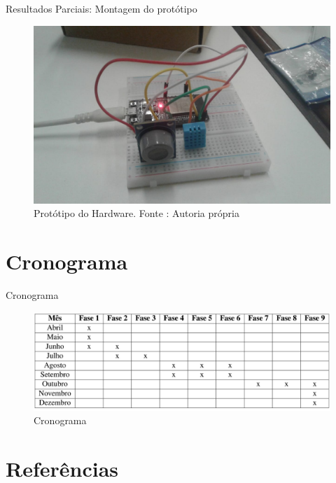 \documentclass[12pt]{beamer}
\begin{document}
    \begin{frame}{Resultados Parciais: Montagem do protótipo}
        \begin{figure}
            \centering
            \includegraphics[width=0.7\linewidth]{prototipo.jpeg}
            \caption{Protótipo do Hardware. Fonte : Autoria própria}
            \label{fig:enter-label}
        \end{figure}
    \end{frame}

    \section{Cronograma}

    \begin{frame}{Cronograma}
            \begin{figure}
            \centering
            \includegraphics[width=0.95\linewidth]{cronograma.png}
            \caption{Cronograma}
            \label{fig:enter-label}
        \end{figure}
    \end{frame}

    \section{Referências}
    
    \printbibliography
\end{document}
